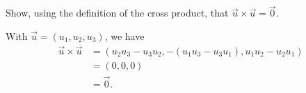 
\begin{Exercise}[
name={},
title={}, 
difficulty=0,
origin={\cite{GHC}}]
Show, using the definition of the cross product, that $\vec u\times\vec u=\vec 0$.

\end{Exercise}

\begin{Answer}
With $\vec u = (u_1,u_2,u_3)$, we have
\begin{align*}
\vec u\times\vec u &= (u_2u_3-u_3u_2,-(u_1u_3-u_3u_1),u_1u_2-u_2u_1) \\
		&= (0,0,0)\\
		&=\vec 0.
\end{align*}

\end{Answer}
